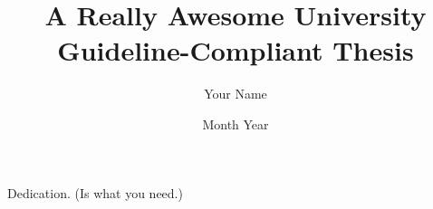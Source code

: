 \documentclass[oneside,hidelinks]{glasgowthesis}
\begin{document}
\pagestyle{empty}

\title{A Really Awesome University Guideline-Compliant Thesis}
\author{Your Name}
\date{Month Year}

\maketitle

\cleardoublepage

 

\newpage
 

\cleardoublepage
\vspace*{1.75in}
\begin{flushright} Dedication. (Is what you need.)\end{flushright}








\tableofcontents
\listoftables
\listoffigures

\cleardoublepage
\pagestyle{fancy}
\setcounter{page}{1}
\end{document}
